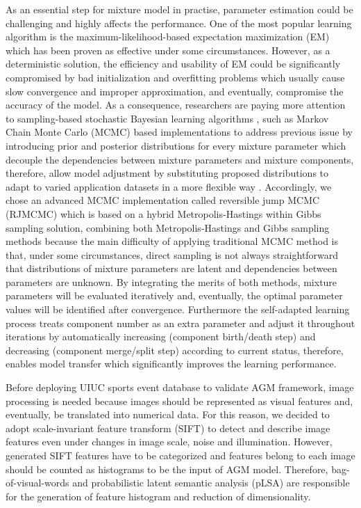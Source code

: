 \documentclass[conference]{IEEEtran}
\begin{document}
As an essential step for mixture model in practise, parameter estimation could be challenging and highly affects the performance. One of the most popular learning algorithm is the maximum-likelihood-based expectation maximization (EM) \cite{Dempster1977} which has been proven as effective under some circumstances. However, as a deterministic solution, the efficiency and usability of EM could be significantly compromised by bad initialization and overfitting problems \cite{Bouguila2009} \cite{Bouguila2012} which usually cause slow convergence and improper approximation, and eventually, compromise the accuracy of the model. As a consequence, researchers are paying more attention to sampling-based stochastic Bayesian learning algorithms \cite{Bourouis2014,Bouguila2008}, such as Markov Chain Monte Carlo (MCMC) based implementations\cite{Fu2018a} to address previous issue by introducing prior and posterior distributions for every mixture parameter which decouple the dependencies between mixture parameters and mixture components, therefore, allow model adjustment by substituting proposed distributions to adapt to varied application datasets in a more flexible way \cite{Bouguila2007,Fu2018}. Accordingly, we chose an advanced MCMC implementation called reversible jump MCMC (RJMCMC)\cite{Bouguila2012} which is based on a hybrid Metropolis-Hastings within Gibbs sampling\cite{Bouguila2009} solution, combining both Metropolis-Hastings \cite{Hastings1970} and Gibbs sampling \cite{Geman1987} methods because the main difficulty of applying traditional MCMC method is that, under some circumstances, direct sampling is not always straightforward that distributions of mixture parameters are latent and dependencies between parameters are unknown. By integrating the merits of both methods, mixture parameters will be evaluated iteratively and, eventually, the optimal parameter values will be identified after convergence. Furthermore the self-adapted learning process \cite{Bouguila2012} treats component number as an extra parameter and adjust it throughout iterations by automatically increasing (component birth/death step) and decreasing (component merge/split step) according to current status, therefore, enables model transfer which significantly improves the learning performance. 

Before deploying UIUC sports event database \cite{Li2007} to validate AGM framework, image processing is needed because images should be represented as visual features and, eventually, be translated into numerical data. For this reason, we decided to adopt scale-invariant feature transform (SIFT) \cite{Lowe1999} to detect and describe image features even under changes in image scale, noise and illumination. However, generated SIFT features have to be categorized and features belong to each image should be counted as histograms to be the input of AGM model. Therefore, bag-of-visual-words \cite{Fei-Fei2005} and probabilistic latent semantic analysis (pLSA)\cite{Hofmann2001} are responsible for the generation of feature histogram and reduction of dimensionality.
\end{document}

